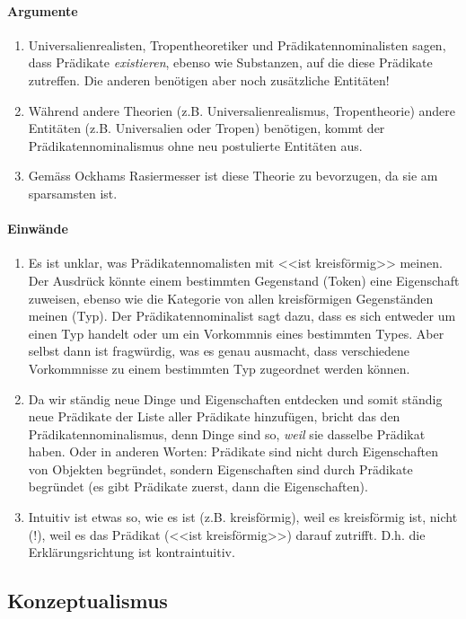 \documentclass[../main.tex]{subfiles}
\begin{document}
\paragraph{Argumente}
\begin{enumerate}
	\item Universalienrealisten, Tropentheoretiker und Prädikatennominalisten sagen, dass Prädikate \textit{existieren}, ebenso wie Substanzen, auf die diese Prädikate zutreffen. Die anderen benötigen aber noch zusätzliche Entitäten!
	\item Während andere Theorien (z.B. Universalienrealismus, Tropentheorie) andere Entitäten (z.B. Universalien oder Tropen) benötigen, kommt der Prädikatennominalismus ohne neu postulierte Entitäten aus.  
	\item Gemäss Ockhams Rasiermesser ist diese Theorie zu bevorzugen, da sie am sparsamsten ist. 
\end{enumerate}
\paragraph{Einwände}
\begin{enumerate}
	\item Es ist unklar, was Prädikatennomalisten mit <<ist kreisförmig>> meinen. Der Ausdrück könnte einem bestimmten Gegenstand (Token) eine Eigenschaft zuweisen, ebenso wie die Kategorie von allen kreisförmigen Gegenständen meinen (Typ). Der Prädikatennominalist sagt dazu, dass es sich entweder um einen Typ handelt oder um ein Vorkommnis eines bestimmten Types. Aber selbst dann ist fragwürdig, was es genau ausmacht, dass verschiedene Vorkommnisse zu einem bestimmten Typ zugeordnet werden können. 
	\item Da wir ständig neue Dinge und Eigenschaften entdecken und somit ständig neue Prädikate der Liste aller Prädikate hinzufügen, bricht das den Prädikatennominalismus, denn Dinge sind so, \textit{weil} sie dasselbe Prädikat haben. Oder in anderen Worten: Prädikate sind nicht durch Eigenschaften von Objekten begründet, sondern Eigenschaften sind durch Prädikate begründet (es gibt Prädikate zuerst, dann die Eigenschaften). 
	\item Intuitiv ist etwas so, wie es ist (z.B. kreisförmig), weil es kreisförmig ist, nicht (!), weil es das Prädikat (<<ist kreisförmig>>) darauf zutrifft. D.h. die Erklärungsrichtung ist kontraintuitiv. 
\end{enumerate}

\subsection{Konzeptualismus}
\end{document}

